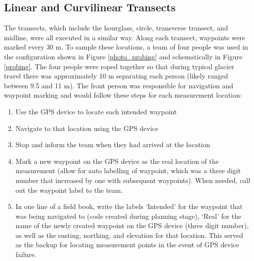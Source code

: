 \documentclass[12pt]{article}
\begin{document}
\subsection{Linear and Curvilinear Transects}
\label{sec:transects}

The transects, which include the hourglass, circle, transverse transect, and midline, were all executed in a similar way. Along each transect, waypoints were marked every 30 m. To sample these locations, a team of four people was used in the configuration shown in Figure \ref{photo_probing} and schematically in Figure \ref{probing}. The four people were roped together so that during typical glacier travel there was approximately 10 m separating each person (likely ranged between 9.5 and 11 m). The front person was responsible for navigation and waypoint marking and would follow these steps for each measurement location:
\begin{enumerate}
\item Use the GPS device to locate each intended waypoint
\item Navigate to that location using the GPS device
\item Stop and inform the team when they had arrived at the location
\item Mark a new waypoint on the GPS device as the real location of the measurement (allow for auto labelling of waypoint, which was a three digit number that increased by one with subsequent waypoints). When needed, call out the waypoint label to the team.
\item In one line of a field book, write the labels `Intended' for the waypoint that was being navigated to (code created during planning stage), `Real' for the name of the newly created waypoint on the GPS device (three digit number), as well as the easting, northing, and elevation for that location. This served as the backup for locating measurement points in the event of GPS device failure. 
\end{enumerate}
\end{document}
